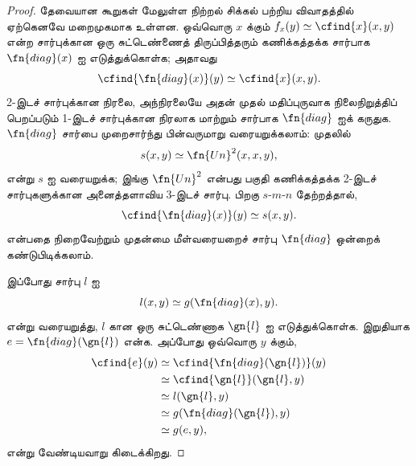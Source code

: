\documentclass[../../../include/open-logic-section]{subfiles}
\begin{document}
\begin{proof}
தேவையான கூறுகள் மேலுள்ள நிற்றல் சிக்கல் பற்றிய விவாதத்தில் ஏற்கெனவே
மறைமுகமாக உள்ளன. ஒவ்வொரு $x$ க்கும்
$f_x(y) \simeq \cfind{x}(x,y)$ என்ற சார்புக்கான ஒரு சுட்டெண்ணைத்
திருப்பித்தரும் கணிக்கத்தக்க சார்பாக $\fn{diag}(x)$ ஐ எடுத்துக்கொள்க;
அதாவது
\[
\cfind{\fn{diag}(x)}(y) \simeq \cfind{x}(x,y).
\]
2-இடச் சார்புக்கான நிரலை, அந்நிரலையே அதன் முதல் மதிப்புருவாக
நிலைநிறுத்திப் பெறப்படும் 1-இடச் சார்புக்கான நிரலாக மாற்றும்
சார்பாக $\fn{diag}$ ஐக் கருதுக. $\fn{diag}$ சார்பை முறைசார்ந்து
பின்வருமாறு வரையறுக்கலாம்: முதலில்
\[
s(x,y) \simeq \fn{Un}^2(x,x,y),
\]
என்று $s$ ஐ வரையறுக்க; இங்கு $\fn{Un}^2$ என்பது பகுதி கணிக்கத்தக்க
2-இடச் சார்புகளுக்கான அனைத்தளாவிய 3-இடச் சார்பு. பிறகு
$s$-$m$-$n$ தேற்றத்தால்,
\[
\cfind{\fn{diag}(x)}(y) \simeq s(x,y).
\]
என்பதை நிறைவேற்றும் முதன்மை மீள்வரையறைச் சார்பு $\fn{diag}$
ஒன்றைக் கண்டுபிடிக்கலாம்.

இப்போது சார்பு $l$ ஐ
\[
l(x,y) \simeq g(\fn{diag}(x),y).
\]
என்று வரையறுத்து, $l$ கான ஒரு சுட்டெண்ணாக $\gn{l}$ ஐ எடுத்துக்கொள்க.
இறுதியாக $e = \fn{diag}(\gn{l})$ என்க. அப்போது ஒவ்வொரு $y$ க்கும்,
\begin{align*}
\cfind{e}(y) & \simeq \cfind{\fn{diag}(\gn{l})}(y) \\
& \simeq \cfind{\gn{l}}(\gn{l}, y) \\
& \simeq l(\gn{l}, y) \\
& \simeq g(\fn{diag}(\gn{l}),y) \\
& \simeq g(e, y),
\end{align*}
என்று வேண்டியவாறு கிடைக்கிறது.
\end{proof}
\end{document}
